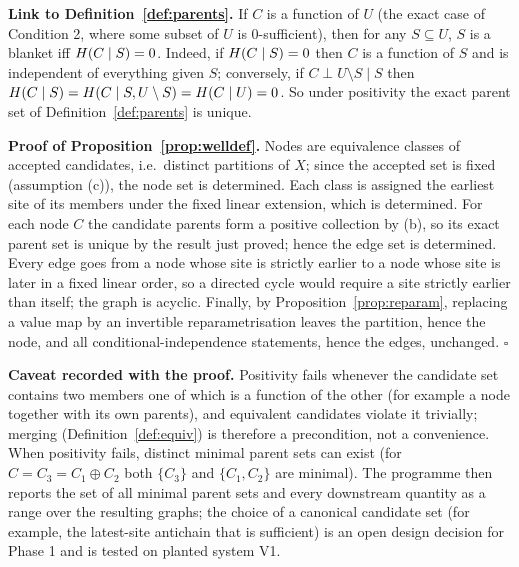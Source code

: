 \textbf{Link to Definition~\ref{def:parents}.} If $C$ is a function of $U$ (the exact
case of Condition 2, where some subset of $U$ is $0$-sufficient), then for
any $S\subseteq U$, $S$ is a blanket iff $H(C\mid S)=0$. Indeed, if
$H(C\mid S)=0$ then $C$ is a function of $S$ and is independent of
everything given $S$; conversely, if $C\perp U\setminus S\mid S$ then
$H(C\mid S)=H(C\mid S,U\setminus S)=H(C\mid U)=0$. So under
positivity the exact parent set of Definition~\ref{def:parents} is unique.

\textbf{Proof of Proposition~\ref{prop:welldef}.} Nodes are equivalence classes of
accepted candidates, i.e.\ distinct partitions of $X$; since the accepted set
is fixed (assumption (c)), the node set is determined. Each class is assigned
the earliest site of its members under the fixed linear extension, which is
determined. For each node $C$ the candidate parents form a positive
collection by (b), so its exact parent set is unique by the result just
proved; hence the edge set is determined. Every edge goes from a node whose
site is strictly earlier to a node whose site is later in a fixed linear
order, so a directed cycle would require a site strictly earlier than
itself; the graph is acyclic. Finally, by Proposition~\ref{prop:reparam}, replacing a
value map by an invertible reparametrisation leaves the partition, hence the
node, and all conditional-independence statements, hence the edges,
unchanged. \hfill$\square$

\textbf{Caveat recorded with the proof.} Positivity fails whenever the
candidate set contains two members one of which is a function of the other
(for example a node together with its own parents), and equivalent
candidates violate it trivially; merging (Definition~\ref{def:equiv}) is therefore a
precondition, not a convenience. When positivity fails, distinct minimal
parent sets can exist (for $C=C_3=C_1\oplus C_2$ both $\{C_3\}$ and
$\{C_1,C_2\}$ are minimal). The programme then reports the set of all
minimal parent sets and every downstream quantity as a range over the
resulting graphs; the choice of a canonical candidate set (for example, the
latest-site antichain that is sufficient) is an open design decision for
Phase 1 and is tested on planted system V1.
